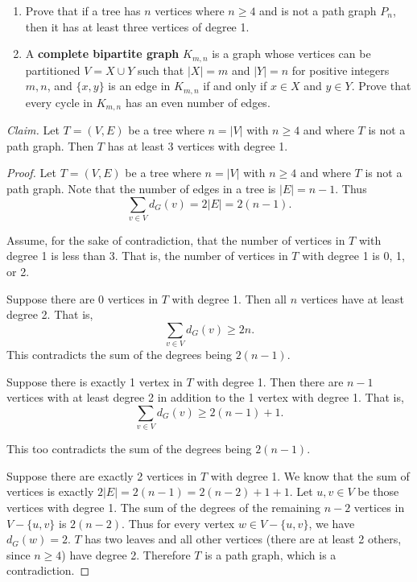 \documentclass{article}
\theoremstyle{definition}
\begin{document}
\begin{question}
\begin{enumerate}
	\item Prove that if a tree has $n$ vertices where $n\geq 4$ and is not a path graph $P_n$, then it has at least three vertices of degree 1.
	\item A \textbf{complete bipartite graph} $K_{m,n}$ is a graph whose vertices can be partitioned $V=X\cup Y$ such that $|X|=m$ and  $|Y|=n$ for positive integers $m,n$, and $\{x, y\}$ is an edge in $K_{m,n}$ if and only if $x\in X$ and $y\in Y$. Prove that every cycle in $K_{m, n}$ has an even number of edges.
	\end{enumerate}
\end{question}
\begin{solution}
\begin{enumerate}
\item\textit{Claim. }Let $T=(V,E)$ be a tree where $n=|V|$ with $n\geq 4$ and where $T$ is not a path graph. Then $T$ has at least 3 vertices with degree 1.
\begin{proof}
\item Let $T=(V,E)$ be a tree where $n=|V|$ with $n\geq 4$ and where $T$ is not a path graph. Note that the number of edges in a tree is $|E|=n-1$. Thus
\[\sum_{v\in V}{d_G(v)}=2|E|=2(n-1).\]

Assume, for the sake of contradiction, that the number of vertices in $T$ with degree 1 is less than 3. That is, the number of vertices in $T$ with degree 1 is 0, 1, or 2.

Suppose there are 0 vertices in $T$ with degree 1. Then all $n$ vertices have at least degree 2. That is, \[\sum_{v\in V}{d_G(v)}\geq 2n.\] This contradicts the sum of the degrees being $2(n-1)$.

Suppose there is exactly 1 vertex in $T$ with degree 1. Then there are $n-1$ vertices with at least degree 2 in addition to the 1 vertex with degree 1. That is, \[\sum_{v\in V}{d_G(v)}\geq 2(n-1)+1.\] 

This too contradicts the sum of the degrees being $2(n-1)$.

Suppose there are exactly 2 vertices in $T$ with degree 1. We know that the sum of vertices is exactly $2|E|=2(n-1)=2(n-2)+1+1$. Let $u,v\in V$ be those vertices with degree 1. The sum of the degrees of the remaining $n-2$ vertices in $V-\{u,v\}$ is $2(n-2)$. Thus for every vertex $w\in V-\{u,v\}$, we have $d_G(w)=2$. $T$ has two leaves and all other vertices (there are at least 2 others, since $n\geq 4$) have degree 2. Therefore $T$ is a path graph, which is a contradiction. 


\end{proof}
\end{enumerate}
\end{solution}
\end{document}
